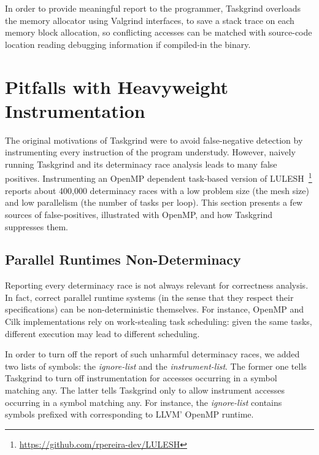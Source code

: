In order to provide meaningful report to the programmer, Taskgrind overloads the memory allocator using Valgrind interfaces, to save a stack trace on each memory block allocation, so conflicting accesses can be matched with source-code location reading debugging information if compiled-in the binary.
    
\section{Pitfalls with Heavyweight Instrumentation} \label{sec:pitfalls}

The original motivations of Taskgrind were to avoid false-negative detection by instrumenting every instruction of the program understudy.
However, naively running Taskgrind and its determinacy race analysis leads to many false positives.
Instrumenting an OpenMP dependent task-based version of LULESH~\footnote{\url{https://github.com/rpereira-dev/LULESH}} reports about 400,000 determinacy races with a low problem size  (the mesh size) and low parallelism  (the number of tasks per loop).
This section presents a few sources of false-positives, illustrated with OpenMP, and how Taskgrind suppresses them.

\subsection{Parallel Runtimes Non-Determinacy}
Reporting every determinacy race is not always relevant for correctness analysis.
In fact, correct parallel runtime systems (in the sense that they respect their specifications) can be non-deterministic themselves.
For instance, OpenMP and Cilk implementations rely on work-stealing task scheduling: given the same tasks, different execution may lead to different scheduling.

In order to turn off the report of such unharmful determinacy races, we added two lists of symbols: the \emph{ignore-list} and the \emph{instrument-list}.
The former one tells Taskgrind to turn off instrumentation for accesses occurring in a symbol matching any.
The latter tells Taskgrind only to allow instrument accesses occurring in a symbol matching any.
For instance, the \emph{ignore-list} contains symbols prefixed with  corresponding to LLVM' OpenMP runtime.

